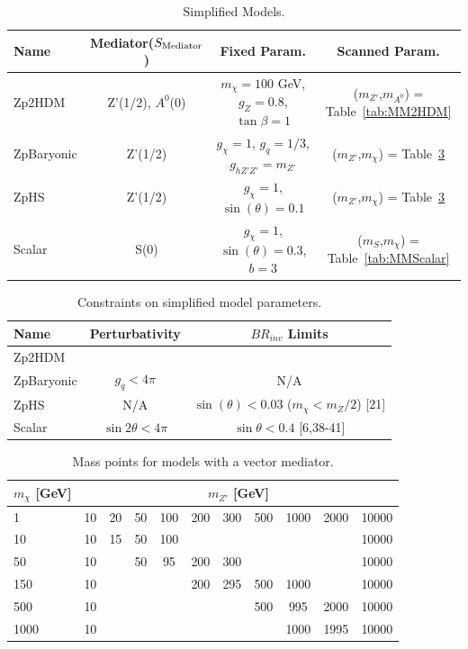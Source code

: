 \begin{table}[htbH]
\begin{center}
\begin{tabular}{ l | c | c | c}
\hline
Name & Mediator($S_{\rm{Mediator}}$) & Fixed Param. & Scanned Param.\\
\hline
Zp2HDM & Z'(1/2), $A^0$(0) & $m_\chi = 100$ GeV, $g_Z = 0.8$, $\tan\beta = 1$ & ($m_{Z'}$,$m_{A^0}$) = Table~\ref{tab:MM2HDM} \\
ZpBaryonic & Z'(1/2) & $g_\chi = 1$, $g_q = 1/3$, $g_{hZ'Z'} = m_{Z'}$ & ($m_{Z'}$,$m_\chi$) = Table~\ref{tab:MMVector} \\
ZpHS & Z'(1/2) & $g_\chi = 1$, $\sin(\theta) = 0.1$ & ($m_{Z'}$,$m_\chi$) = Table~\ref{tab:MMVector} \\
Scalar & S(0) & $g_\chi = 1$, $\sin(\theta) = 0.3$, $b = 3$ & ($m_{S}$,$m_\chi$) = Table~\ref{tab:MMScalar}\\
\hline
\end{tabular}
\caption{Simplified Models.}\label{tab:sms}
\end{center}
\end{table}

\begin{table}[htbH]
\begin{center}
\begin{tabular}{ l | c | c}
\hline
Name & Perturbativity & $BR_{inv}$ Limits \\
\hline
Zp2HDM & & \\
ZpBaryonic & $g_q<4\pi$ & N/A\\
ZpHS & N/A & $\sin(\theta) < 0.03$ ($m_\chi < m_Z/2$) [21] \\
Scalar & $\sin2\theta<4\pi$ & $\sin\theta<0.4$ [6,38-41]\\
\hline
\end{tabular}
\caption{Constraints on simplified model parameters.}\label{tab:smlims}
\end{center}
\end{table}

\begin{table}[htbH]
\begin{center}
\begin{tabular}{ l | c | c | c | c | c | c | c | c | c | c}
\hline
$m_\chi$ [GeV] & \multicolumn{10}{|c}{$m_{Z'}$ [GeV]} \\
\hline
1 & 10 & 20 & 50 & 100 & 200 & 300 & 500 & 1000 & 2000 & 10000 \\
10 & 10 & 15 & 50 & 100 & & & & & & 10000 \\
50 & 10 & & 50 & 95  & 200 & 300 & & & & 10000 \\
150 & 10 & & & & 200 & 295 & 500 & 1000 & & 10000 \\
500 & 10 & & & & & & 500 & 995 & 2000 & 10000 \\
1000 & 10 & & & & & & & 1000 & 1995 & 10000 \\
\hline
\end{tabular}
\caption{Mass points for models with a vector mediator.}\label{tab:MMVector}
\end{center}
\end{table}

